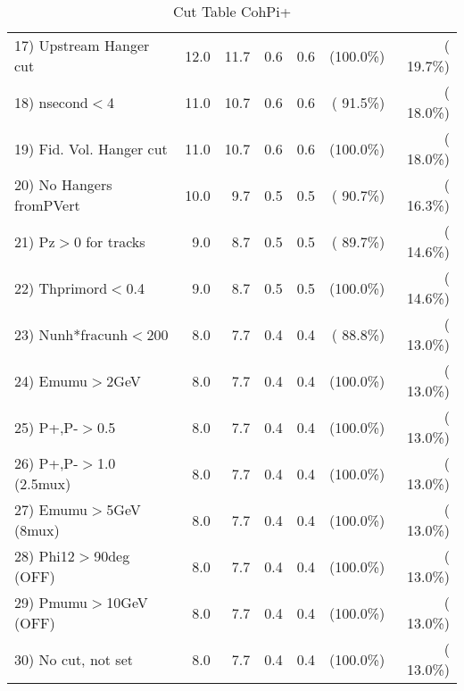 \begin{table}[h!]
\begin{tabular}{||l||r|r|r|r|r|r||}
 17) Upstream Hanger cut  &         12.0 &         11.7 &          0.6 &          0.6 & (100.0\%) & ( 19.7\%) \\
 18) nsecond$<$4          &         11.0 &         10.7 &          0.6 &          0.6 & ( 91.5\%) & ( 18.0\%) \\
 19) Fid. Vol. Hanger cut &         11.0 &         10.7 &          0.6 &          0.6 & (100.0\%) & ( 18.0\%) \\
 20) No Hangers fromPVert &         10.0 &          9.7 &          0.5 &          0.5 & ( 90.7\%) & ( 16.3\%) \\
 21) Pz$>$0 for tracks    &          9.0 &          8.7 &          0.5 &          0.5 & ( 89.7\%) & ( 14.6\%) \\
 22) Thprimord$<$0.4      &          9.0 &          8.7 &          0.5 &          0.5 & (100.0\%) & ( 14.6\%) \\
 23) Nunh*fracunh$<$200   &          8.0 &          7.7 &          0.4 &          0.4 & ( 88.8\%) & ( 13.0\%) \\
 24) Emumu$>$2GeV         &          8.0 &          7.7 &          0.4 &          0.4 & (100.0\%) & ( 13.0\%) \\
 25) P+,P-$>$0.5          &          8.0 &          7.7 &          0.4 &          0.4 & (100.0\%) & ( 13.0\%) \\
 26) P+,P-$>$1.0 (2.5mux) &          8.0 &          7.7 &          0.4 &          0.4 & (100.0\%) & ( 13.0\%) \\
 27) Emumu$>$5GeV  (8mux) &          8.0 &          7.7 &          0.4 &          0.4 & (100.0\%) & ( 13.0\%) \\
 28) Phi12$>$90deg  (OFF) &          8.0 &          7.7 &          0.4 &          0.4 & (100.0\%) & ( 13.0\%) \\
 29) Pmumu$>$10GeV  (OFF) &          8.0 &          7.7 &          0.4 &          0.4 & (100.0\%) & ( 13.0\%) \\
 30) No cut, not set      &          8.0 &          7.7 &          0.4 &          0.4 & (100.0\%) & ( 13.0\%) \\
 \hline
 \hline
 \end{tabular}
 \caption{Cut Table  CohPi+   }
 \label{tab-cutcohjpsi-mumu_nuecc}
 \end{table}
